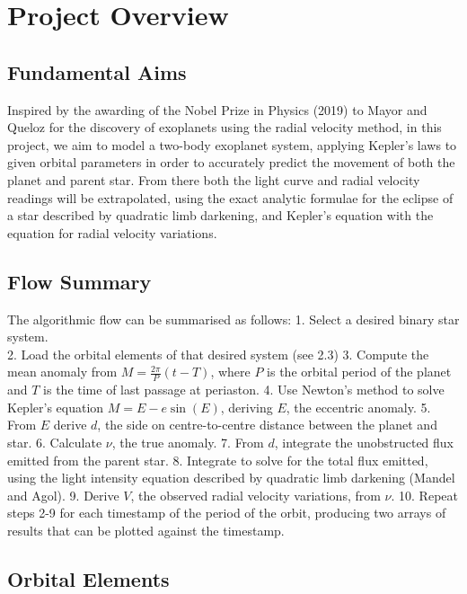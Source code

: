 \documentclass[11pt]{article}
\begin{document}
    \hypertarget{project-overview}{%
\section{Project Overview}\label{project-overview}}


\hypertarget{fundamental-aims}{%
\subsection{Fundamental Aims}\label{fundamental-aims}}

Inspired by the awarding of the Nobel Prize in Physics (2019) to Mayor
and Queloz for the discovery of exoplanets using the radial velocity
method, in this project, we aim to model a two-body exoplanet system,
applying Kepler's laws to given orbital parameters in order to
accurately predict the movement of both the planet and parent star. From
there both the light curve and radial velocity readings will be
extrapolated, using the exact analytic formulae for the eclipse of a
star described by quadratic limb darkening, and Kepler's equation with
the equation for radial velocity variations.

\hypertarget{flow-summary}{%
\subsection{Flow Summary}\label{flow-summary}}

The algorithmic flow can be summarised as follows: 1. Select a desired
binary star system.\\
2. Load the orbital elements of that desired system (see 2.3) 3. Compute
the mean anomaly from \(M = \frac{2\pi}{P}(t-T)\), where \(P\) is the
orbital period of the planet and \(T\) is the time of last passage at
periaston. 4. Use Newton's method to solve Kepler's equation
\(M =E - e\sin(E)\), deriving \(E\), the eccentric anomaly. 5. From
\(E\) derive \(d\), the side on centre-to-centre distance between the
planet and star. 6. Calculate \(\nu\), the true anomaly. 7. From \(d\),
integrate the unobstructed flux emitted from the parent star. 8.
Integrate to solve for the total flux emitted, using the light intensity
equation described by quadratic limb darkening (Mandel and Agol). 9.
Derive \(V\), the observed radial velocity variations, from \(\nu\). 10.
Repeat steps 2-9 for each timestamp of the period of the orbit,
producing two arrays of results that can be plotted against the
timestamp.

    \hypertarget{orbital-elements}{%
\subsection{Orbital Elements}\label{orbital-elements}}
\end{document}

